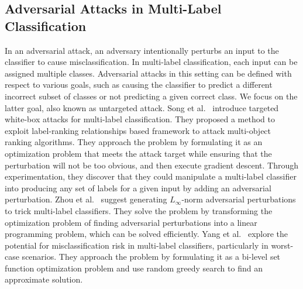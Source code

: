 \subsection{Adversarial Attacks in Multi-Label Classification}
In an adversarial attack, an adversary intentionally perturbs an input to the classifier to cause misclassification.
In multi-label classification, each input can be assigned multiple classes.
Adversarial attacks in this setting can be defined with respect to various goals, such as causing the classifier to predict a different incorrect subset of classes or not predicting a given correct class.
We focus on the latter goal, also known as untargeted attack.
    Song et al.~\cite{MULTIlABEL1} introduce targeted white-box attacks for multi-label classification.
    They proposed a method to exploit label-ranking relationships based framework to attack multi-object ranking algorithms.
    They approach the problem by formulating it as an optimization problem that meets the attack target while ensuring that the perturbation will not be too obvious, and then execute gradient descent.
    Through experimentation, they discover that they could manipulate a multi-label classifier into producing any set of labels for a given input by adding an adversarial perturbation.
    Zhou et al.~\cite{MULTIlABEL2} suggest generating $L_{\infty}$-norm adversarial perturbations to trick multi-label classifiers.
    They solve the problem by transforming the optimization problem of finding adversarial perturbations into a linear programming problem, which can be solved efficiently.
    Yang et al.~\cite{MULTIlABEL3} explore the potential for misclassification risk in multi-label classifiers, particularly in worst-case scenarios.
    They approach the problem by formulating it as a bi-level set function optimization problem and use random greedy search to find an approximate solution.

